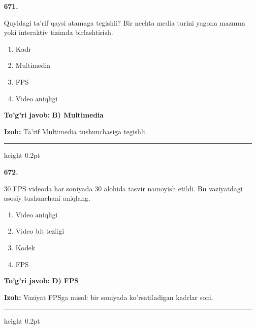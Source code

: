 \documentclass[10pt,a4paper,oneside]{article}
\begin{document}
\noindent\textbf{\color{ink}671.}
\par
Quyidagi ta'rif qaysi atamaga tegishli? Bir nechta media turini yagona mazmun yoki interaktiv tizimda birlashtirish.
\begin{enumerate}[label=\Alph*),leftmargin=9mm]
\item Kadr
\item Multimedia
\item FPS
\item Video aniqligi
\end{enumerate}
\begin{tcolorbox}[enhanced,breakable,colback=teal!4,colframe=teal!50!black,boxrule=0.5pt,arc=1.1mm,left=3mm,right=3mm,top=1.7mm,bottom=1.7mm,before skip=2mm,after skip=2mm]
\textbf{\color{teal}To'g'ri javob:} \textbf{B) Multimedia}
\par\smallskip
\textbf{Izoh:} Ta'rif Multimedia tushunchasiga tegishli.
\end{tcolorbox}
\vspace{2mm}\hrule height 0.2pt \vspace{3mm}

\noindent\textbf{\color{ink}672.}
\par
30 FPS videoda har soniyada 30 alohida tasvir namoyish etildi. Bu vaziyatdagi asosiy tushunchani aniqlang.
\begin{enumerate}[label=\Alph*),leftmargin=9mm]
\item Video aniqligi
\item Video bit tezligi
\item Kodek
\item FPS
\end{enumerate}
\begin{tcolorbox}[enhanced,breakable,colback=teal!4,colframe=teal!50!black,boxrule=0.5pt,arc=1.1mm,left=3mm,right=3mm,top=1.7mm,bottom=1.7mm,before skip=2mm,after skip=2mm]
\textbf{\color{teal}To'g'ri javob:} \textbf{D) FPS}
\par\smallskip
\textbf{Izoh:} Vaziyat FPSga misol: bir soniyada ko'rsatiladigan kadrlar soni.
\end{tcolorbox}
\vspace{2mm}\hrule height 0.2pt \vspace{3mm}
\end{document}
